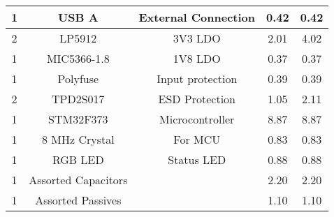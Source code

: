 \begin{table}[H]
\begin{tabular}{|c|c|c|c|c|}
		1                 & USB A                      & External Connection & 0.42                                                                  & 0.42                                                                     \\ \hline
		2                 & LP5912                     & 3V3 LDO                  & 2.01                                                                 & 4.02                                                                     \\ \hline
		1                 & MIC5366-1.8                & 1V8 LDO                  & 0.37                                                                  & 0.37                                                                      \\ \hline
		1                 & Polyfuse                   & Input protection   & 0.39                                                                  & 0.39                                                                      \\ \hline
		2                 & TPD2S017                   & ESD Protection           & 1.05                                                                  & 2.11                                                                      \\ \hline
		1                 & STM32F373              & Microcontroller           & 8.87                                                                 & 8.87                                                                      \\ \hline
		1                 & 8 MHz Crystal              & For MCU                  & 0.83                                                                  & 0.83                                                                      \\ \hline
		1                 & RGB LED                    & Status LED               & 0.88                                                                  & 0.88                                                                      \\ \hline
		1                 & Assorted Capacitors        &                          & 2.20                                                                    & 2.20                                                                        \\ \hline
		1                 & Assorted Passives &                          & 1.10                                                                    & 1.10                                                                        \\ \hline

\end{tabular}
\end{table}
